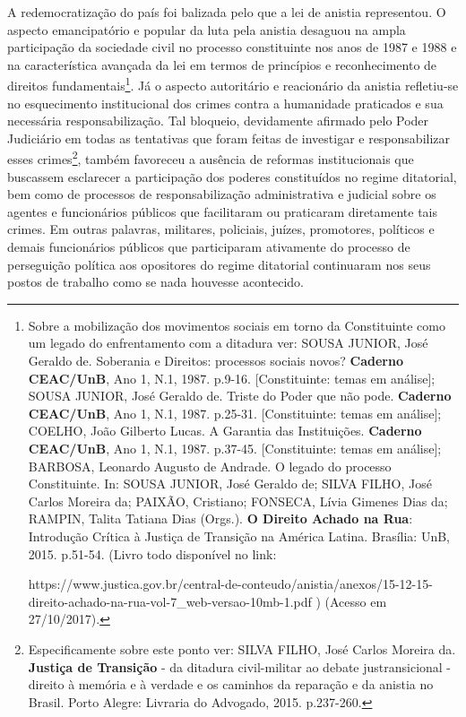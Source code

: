 A redemocratização do país foi balizada pelo que a lei de anistia
representou. O aspecto emancipatório e popular da luta pela anistia
desaguou na ampla participação da sociedade civil no processo
constituinte nos anos de 1987 e 1988 e na característica avançada da lei
em termos de princípios e reconhecimento de direitos
fundamentais\footnote{Sobre a mobilização dos movimentos sociais em
  torno da Constituinte como um legado do enfrentamento com a ditadura
  ver: SOUSA JUNIOR, José Geraldo de. Soberania e Direitos: processos
  sociais novos? \textbf{Caderno CEAC/UnB}, Ano 1, N.1, 1987. p.9-16.
  {[}Constituinte: temas em análise{]}; SOUSA JUNIOR, José Geraldo de.
  Triste do Poder que não pode. \textbf{Caderno CEAC/UnB}, Ano 1, N.1,
  1987. p.25-31. {[}Constituinte: temas em análise{]}; COELHO, João
  Gilberto Lucas. A Garantia das Instituições. \textbf{Caderno
  CEAC/UnB}, Ano 1, N.1, 1987. p.37-45. {[}Constituinte: temas em
  análise{]}; BARBOSA, Leonardo Augusto de Andrade. O legado do processo
  Constituinte. In: SOUSA JUNIOR, José Geraldo de; SILVA FILHO, José
  Carlos Moreira da; PAIXÃO, Cristiano; FONSECA, Lívia Gimenes Dias da;
  RAMPIN, Talita Tatiana Dias (Orgs.). \textbf{O Direito Achado na Rua}:
  Introdução Crítica à Justiça de Transição na América Latina. Brasília:
  UnB, 2015. p.51-54. (Livro todo disponível no link:

  https://www.justica.gov.br/central-de-conteudo/anistia/anexos/15-12-15-direito-achado-na-rua-vol-7\_web-versao-10mb-1.pdf
  { } ) (Acesso em 27/10/2017).}. Já o aspecto autoritário e reacionário
da anistia refletiu-se no esquecimento institucional dos crimes contra a
humanidade praticados e sua necessária responsabilização. Tal bloqueio,
devidamente afirmado pelo Poder Judiciário em todas as tentativas que
foram feitas de investigar e responsabilizar esses crimes\footnote{Especificamente
  sobre este ponto ver: SILVA FILHO, José Carlos Moreira da.
  \textbf{Justiça de Transição} - da ditadura civil-militar ao debate
  justransicional - direito à memória e à verdade e os caminhos da
  reparação e da anistia no Brasil. Porto Alegre: Livraria do Advogado,
  2015. p.237-260.}, também favoreceu a ausência de reformas
institucionais que buscassem esclarecer a participação dos poderes
constituídos no regime ditatorial, bem como de processos de
responsabilização administrativa e judicial sobre os agentes e
funcionários públicos que facilitaram ou praticaram diretamente tais
crimes. Em outras palavras, militares, policiais, juízes, promotores,
políticos e demais funcionários públicos que participaram ativamente do
processo de perseguição política aos opositores do regime ditatorial
continuaram nos seus postos de trabalho como se nada houvesse
acontecido.

